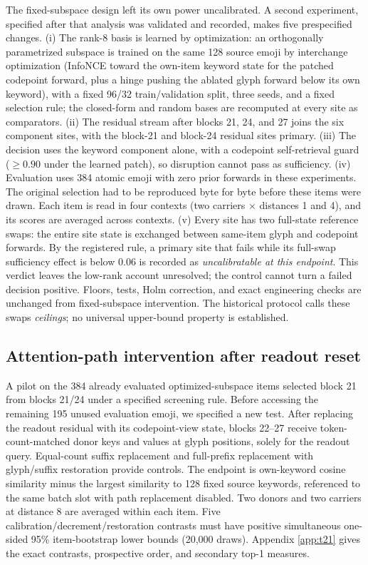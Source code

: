 \documentclass{article}
\begin{document}
The fixed-subspace design left its own power uncalibrated. A second experiment,
specified after that analysis was validated and recorded, makes
five prespecified changes. (i) The rank-8 basis is learned by optimization:
an orthogonally parametrized subspace is trained on the same 128 source emoji
by interchange optimization (InfoNCE toward the own-item keyword state for
the patched codepoint forward, plus a hinge pushing the ablated glyph forward
below its own keyword), with a fixed 96/32 train/validation split, three
seeds, and a fixed selection rule; the closed-form and random bases are
recomputed at every site as comparators. (ii) The residual stream after
blocks 21, 24, and 27 joins the six component sites, with the block-21 and
block-24 residual sites primary. (iii) The decision uses the keyword
component alone, with a codepoint self-retrieval guard ($\geq0.90$ under the
learned patch), so disruption cannot pass as sufficiency. (iv) Evaluation
uses 384 atomic emoji with zero prior forwards in these experiments. The original
selection had to be reproduced byte for byte before these items were drawn.
Each item is read in four contexts (two carriers $\times$ distances 1 and 4),
and its scores are averaged across contexts. (v) Every site has two
full-state reference swaps: the entire
site state is exchanged between same-item glyph and codepoint forwards. By
the registered rule, a primary site that fails while its full-swap sufficiency effect
is below $0.06$ is recorded as \emph{uncalibratable at this endpoint}.
This verdict leaves the low-rank account unresolved; the control cannot turn
a failed decision positive. Floors, tests, Holm correction, and exact
engineering checks are unchanged from fixed-subspace intervention.
The historical protocol calls these swaps \emph{ceilings}; no universal
upper-bound property is established.

\subsection{Attention-path intervention after readout reset}
\label{sec:t21}

A pilot on the 384 already evaluated optimized-subspace items selected block 21 from
blocks 21/24 under a specified screening rule. Before accessing the remaining
195 unused evaluation emoji, we specified a new test. After replacing the
readout residual with its codepoint-view state, blocks 22--27 receive
token-count-matched donor keys and values at glyph positions, solely for the
readout query. Equal-count suffix replacement and full-prefix replacement
with glyph/suffix restoration provide controls. The endpoint is own-keyword
cosine similarity minus the largest similarity to 128 fixed source keywords,
referenced to the same batch slot with path replacement disabled. Two donors
and two carriers at distance 8 are averaged within each item. Five
calibration/decrement/restoration contrasts must have positive simultaneous
one-sided 95\% item-bootstrap lower bounds (20,000 draws). Appendix
\ref{app:t21} gives the exact contrasts, prospective order, and secondary
top-1 measures.
\end{document}
